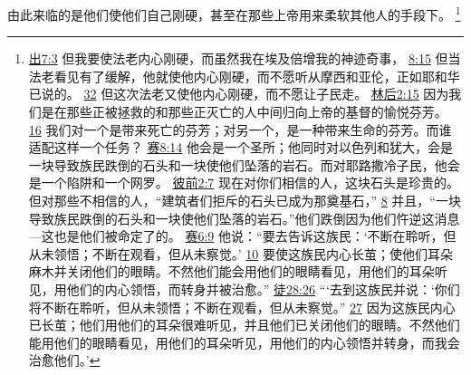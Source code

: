 \documentclass[12pt, a4paper, oneside]{ctexart}
\begin{document}
	由此来临的是他们使他们自己刚硬，甚至在那些上帝用来柔软其他人的手段下。
	\footnote {
		\href{https://biblehub.com/exodus/7-3.htm}{出7:3} 但我要使法老内心刚硬，而虽然我在埃及倍增我的神迹奇事，
		\href{https://biblehub.com/exodus/8-15.htm}{8:15} 但当法老看见有了缓解，他就使他内心刚硬，而不愿听从摩西和亚伦，正如耶和华已说的。
		\href{https://biblehub.com/exodus/8-32.htm}{32} 但这次法老又使他内心刚硬，而不愿让子民走。
		\href{https://biblehub.com/2_corinthians/2-15.htm}{林后2:15} 因为我们是在那些正被拯救的和那些正灭亡的人中间归向上帝的基督的愉悦芬芳。
		\href{https://biblehub.com/2_corinthians/2-16.htm}{16} 我们对一个是带来死亡的芬芳；对另一个，是一种带来生命的芬芳。而谁适配这样一个任务？
		\href{https://biblehub.com/isaiah/8-14.htm}{赛8:14} 他会是一个圣所；他同时对以色列和犹大，会是一块导致族民跌倒的石头和一块使他们坠落的岩石。而对耶路撒冷子民，他会是一个陷阱和一个网罗。
		\href{https://biblehub.com/1_peter/2-7.htm}{彼前2:7} 现在对你们相信的人，这块石头是珍贵的。但对那些不相信的人，“建筑者们拒斥的石头已成为那奠基石，”
		\href{https://biblehub.com/1_peter/2-8.htm}{8} 并且，“一块导致族民跌倒的石头和一块使他们坠落的岩石。”他们跌倒因为他们忤逆这消息---这也是他们被命定了的。
		\href{https://biblehub.com/isaiah/6-9.htm}{赛6:9} 他说：“要去告诉这族民：‘不断在聆听，但从未领悟；不断在观看，但从未察觉。’
		\href{https://biblehub.com/isaiah/6-10.htm}{10} 要使这族民内心长茧；使他们耳朵麻木并关闭他们的眼睛。不然他们能会用他们的眼睛看见，用他们的耳朵听见，用他们的内心领悟，而转身并被治愈。”
		\href{https://biblehub.com/acts/28-26.htm}{徒28:26} “‘去到这族民并说：‘你们将不断在聆听，但从未领悟；不断在观看，但从未察觉。”
		\href{https://biblehub.com/acts/28-27.htm}{27} 因为这族民内心已长茧；他们用他们的耳朵很难听见，并且他们已关闭他们的眼睛。不然他们能用他们的眼睛看见，用他们的耳朵听见，用他们的内心领悟并转身，而我会治愈他们。’
	}
\end{document}
